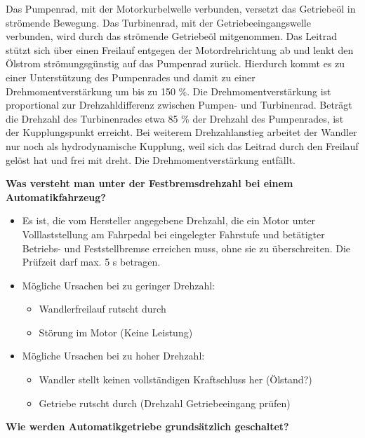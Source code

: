 Das Pumpenrad, mit der Motorkurbelwelle verbunden, versetzt das
Getriebeöl in strömende Bewegung. Das Turbinenrad, mit der
Getriebeeingangswelle verbunden, wird durch das strömende Getriebeöl
mitgenommen. Das Leitrad stützt sich über einen Freilauf entgegen der
Motordrehrichtung ab und lenkt den Ölstrom strömungsgünstig auf das
Pumpenrad zurück. Hierdurch kommt es zu einer Unterstützung des
Pumpenrades und damit zu einer Drehmomentverstärkung um bis zu 150 \%.
Die Drehmomentverstärkung ist proportional zur Drehzahldifferenz
zwischen Pumpen- und Turbinenrad. Beträgt die Drehzahl des Turbinenrades
etwa 85 \% der Drehzahl des Pumpenrades, ist der Kupplungspunkt
erreicht. Bei weiterem Drehzahlanstieg arbeitet der Wandler nur noch als
hydrodynamische Kupplung, weil sich das Leitrad durch den Freilauf
gelöst hat und frei mit dreht. Die Drehmomentverstärkung entfällt.

\textbf{Was versteht man unter der Festbremsdrehzahl bei einem
Automatikfahrzeug?}

\begin{itemize}
\item
  Es ist, die vom Hersteller angegebene Drehzahl, die ein Motor unter
  Volllaststellung am Fahrpedal bei eingelegter Fahrstufe und betätigter
  Betriebs- und Feststellbremse erreichen muss, ohne sie zu
  überschreiten. Die Prüfzeit darf max. 5 s betragen.
\item
  Mögliche Ursachen bei zu geringer Drehzahl:

  \begin{itemize}
  \item
    Wandlerfreilauf rutscht durch
  \item
    Störung im Motor (Keine Leistung)
  \end{itemize}
\item
  Mögliche Ursachen bei zu hoher Drehzahl:

  \begin{itemize}
  \item
    Wandler stellt keinen vollständigen Kraftschluss her (Ölstand?)
  \item
    Getriebe rutscht durch (Drehzahl Getriebeeingang prüfen)
  \end{itemize}
\end{itemize}

\newpage

\textbf{Wie werden Automatikgetriebe grundsätzlich geschaltet?}

